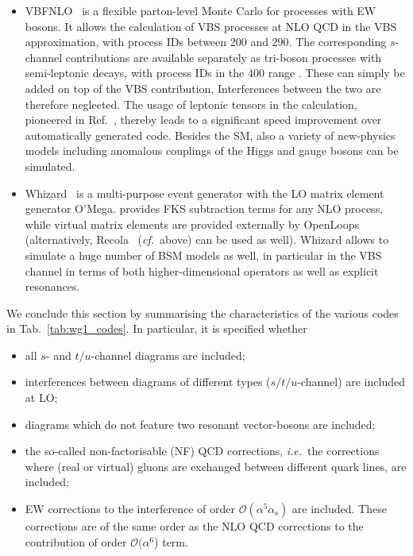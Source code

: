 \documentclass[twocolumn,epjc3]{svjour3} %
\newcommand{\ZM}[1]{{ {\color{green}{ [MZ: #1]}} }}
\newcommand{\alphas}{\ensuremath{\alpha_\text{s}}\xspace}
\begin{document}
\begin{itemize}
      \item {\sc VBFNLO}~\cite{Arnold:2008rz, Arnold:2011wj, Baglio:2014uba} is a flexible
        parton-level Monte Carlo for processes with EW bosons. It
        allows the calculation of VBS processes at NLO QCD in the VBS
        approximation, with process IDs between 200 and 290. The corresponding
        $s$-channel contributions are available separately as tri-boson processes with
        semi-leptonic decays, with process IDs in the 400 range\ZM{which range is it?}. These can simply
        be added on top of the VBS contribution. Interferences between the two are therefore neglected.
        The usage of leptonic tensors in the calculation, pioneered in
        Ref.~\cite{Jager:2006zc}, thereby leads to a significant speed improvement over
        automatically generated code.  Besides the SM, also a variety of
        new-physics models including anomalous couplings of the Higgs and gauge
        bosons can be simulated.

      \item {\sc Whizard}~\cite{Moretti:2001zz,Kilian:2007gr} is a multi-purpose
          event generator with the LO matrix element generator {\sc O'Mega}. \ZM{ if NLO results for this processes cannot be provided, we should skip what follows, or at least clarify the limitations}
    provides FKS subtraction terms for any NLO process, while virtual matrix
    elements are provided externally by {\sc
    OpenLoops}~\cite{Cascioli:2011va} (alternatively, {\sc Recola}~\cite{Actis:2012qn,Actis:2016mpe}
    (\emph{cf.}\ above) can be used as well). {\sc Whizard} allows to simulate a
    huge number of BSM models as well, in particular in
    the VBS channel in terms of both higher-dimensional operators as well as explicit
    resonances.

    \end{itemize}

    We conclude this section by summarising the characteristics of the various codes in Tab.~\ref{tab:wg1_codes}.
    In particular, it is specified whether
    \begin{itemize}
        \item all $s$- and $t/u$-channel diagrams are included;
        \item interferences between diagrams of different types ($s/t/u$-channel) are included at LO;
        \item diagrams which do not feature two resonant vector-bosons are included;
        \item the so-called non-factorisable (NF) QCD corrections, \emph{i.e.}\ the corrections where (real or virtual) gluons are exchanged between different quark lines,
            are included;
        \item EW corrections to the interference of order $\mathcal O (\alpha^5\alphas)$ are included.
        These corrections are of the same order as the NLO QCD corrections to the contribution of order $\mathcal O (\alpha^6$) term.
    \end{itemize}
\end{document}
